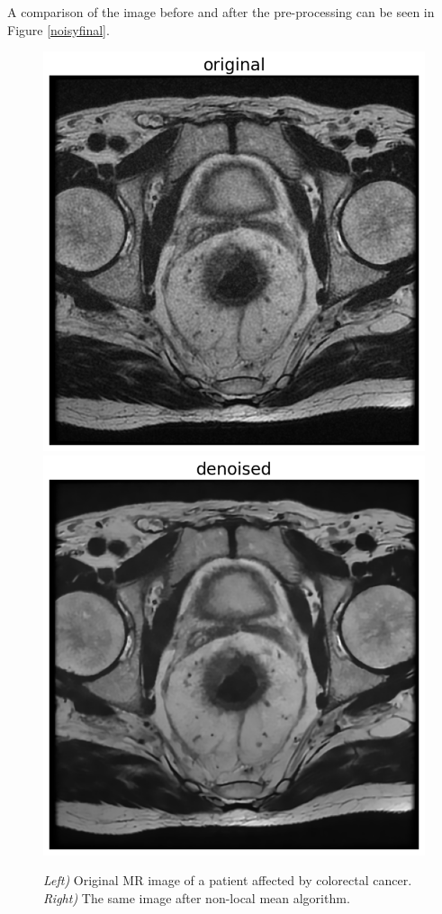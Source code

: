 \documentclass{standalone}
\begin{document}
A comparison of the image before and after the pre-processing can be seen in Figure \ref{noisyfinal}.

\begin{figure}[htp]

    \centering
    \includegraphics[width=.49\textwidth]{../images/noisy.png}
    \includegraphics[width=.49\textwidth]{../images/denoised.png}
    
    \caption{ \textit{ Left)} Original MR image of a patient affected by colorectal cancer.\textit{ Right)} The same image after non-local mean algorithm.}
    \label{noisydenoised}
    
    \end{figure}
\end{document}
